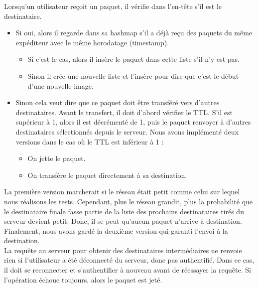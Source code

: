         Lorsqu'un utilisateur reçoit un paquet, il vérifie dans l'en-tête s'il est le destinataire.\\
        \begin{itemize}
            \item  Si oui, alors il regarde dans sa hashmap s'il a déjà reçu des paquets du même expéditeur avec le même horodatage (timestamp). 
            \begin{itemize}
                     \item Si c'est le cas, alors il insère le paquet dans cette liste s'il n'y est pas.
                     \item Sinon il crée une nouvelle liste et l'insère pour dire que c'est le début d'une nouvelle image.
            \end{itemize}
            \item Sinon cela veut dire que ce paquet doit être transféré vers d'autres destinataires.
            Avant le transfert, il doit d'abord vérifier le TTL. S'il est supérieur à 1, alors il est décrémenté de 1, puis le paquet renvoyer à d'autres destinataires sélectionnés depuis le serveur. Nous avons implémenté deux versions dans le cas où le TTL est inférieur à 1 :
            \begin{itemize}
                \item On jette le paquet.
                \item On transfère le paquet directement à sa destination.
            \end{itemize}
        \end{itemize}
        La première version marcherait si le réseau était petit comme celui sur lequel nous réalisons les tests. Cependant, plus le réseau grandit, plus la probabilité que le destinataire finale fasse partie de la liste des prochains destinataires tirés du serveur devient petit. Donc, il se peut qu'aucun paquet n'arrive à destination.
        Finalement, nous avons gardé la deuxième version qui garanti l'envoi à la destination. \\
        
        La requête au serveur pour obtenir des destinataires intermédiaires ne renvoie rien si l'utilisateur a été déconnecté du serveur, donc pas authentifié. Dans ce cas, il doit se reconnecter et s'authentifier à nouveau avant de réessayer la requête. Si l'opération échoue toujours, alors le paquet est jeté.
        
